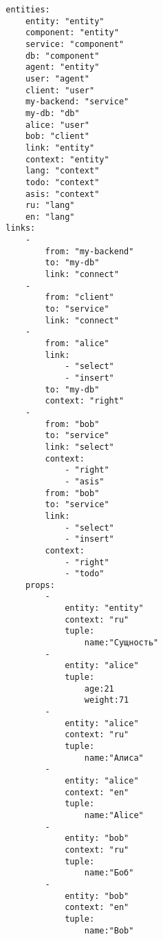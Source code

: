 \documentclass[final]{article}
\begin{document}
        \begin{verbatim}
        entities:
            entity: "entity"
            component: "entity"
            service: "component"
            db: "component"
            agent: "entity"
            user: "agent"
            client: "user"
            my-backend: "service"
            my-db: "db"
            alice: "user"
            bob: "client"
            link: "entity"
            context: "entity"
            lang: "context"
            todo: "context"
            asis: "context"
            ru: "lang"
            en: "lang"
        links:         
            -              
                from: "my-backend"
                to: "my-db"
                link: "connect"
            -
                from: "client"
                to: "service"
                link: "connect"
            -              
                from: "alice"
                link:
                    - "select"
                    - "insert"
                to: "my-db"
                context: "right"
            - 
                from: "bob" 
                to: "service"
                link: "select"
                context: 
                    - "right"
                    - "asis"
                from: "bob" 
                to: "service"
                link:
                    - "select"
                    - "insert"
                context: 
                    - "right"
                    - "todo"
            props:
                -
                    entity: "entity"
                    context: "ru"
                    tuple: 
                        name:"Сущность"
                -
                    entity: "alice"
                    tuple: 
                        age:21
                        weight:71
                -
                    entity: "alice"
                    context: "ru"
                    tuple: 
                        name:"Алиса"
                -
                    entity: "alice"
                    context: "en"
                    tuple: 
                        name:"Alice"
                -
                    entity: "bob"
                    context: "ru"
                    tuple: 
                        name:"Боб"
                -
                    entity: "bob"
                    context: "en"
                    tuple: 
                        name:"Bob"
        \end{verbatim}
\end{document}
